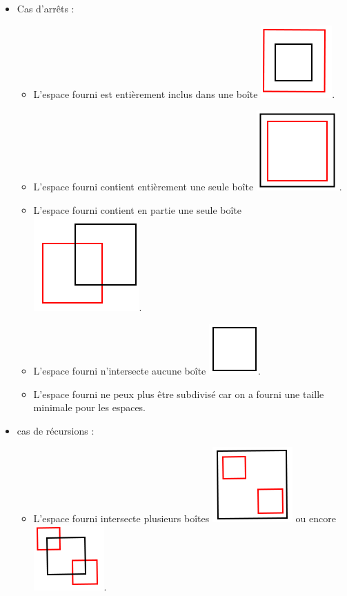 \begin{itemize}
\item Cas d'arrêts : 
\begin{itemize}
\item L'espace fourni est entièrement inclus dans une boîte \includegraphics[scale=0.20]{img/QT1}.
\item L'espace fourni contient entièrement une seule boîte \includegraphics[scale=0.20]{img/QT2}.
\item L'espace fourni contient en partie une seule boîte \includegraphics[scale=0.20]{img/QT3}.
\item L'espace fourni n'intersecte aucune boîte \includegraphics[scale=0.30]{img/QT6}.
\item L'espace fourni ne peux plus être subdivisé car on a fourni une taille minimale pour les espaces.
\end{itemize}
\item cas de récursions :
\begin{itemize}
\item L'espace fourni intersecte plusieurs boîtes \includegraphics[scale=0.20]{img/QT4} ou encore \includegraphics[scale=0.20]{img/QT5}.
\end{itemize}
\end{itemize}

